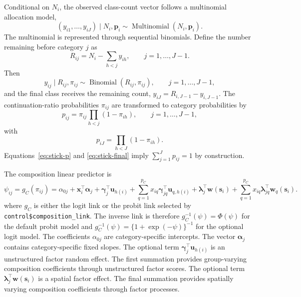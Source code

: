 \documentclass[11pt]{article}
\newcommand{\balpha}{\bm{\alpha}}
\newcommand{\bgamma}{\bm{\gamma}}
\newcommand{\blambda}{\bm{\lambda}}
\newcommand{\bp}{\bm{p}}
\newcommand{\bu}{\bm{u}}
\newcommand{\bw}{\bm{w}}
\newcommand{\bx}{\bm{x}}
\newcommand{\bs}{\bm{s}}
\newcommand{\trans}{^\top}
\newcommand{\Mult}{\operatorname{Multinomial}}
\newcommand{\Bin}{\operatorname{Binomial}}
\begin{document}
Conditional on \(N_i\), the observed class-count vector follows a multinomial
allocation model,
\begin{equation}
  (y_{i1},\ldots,y_{iJ})\mid N_i,\bp_i
  \sim
  \Mult(N_i,\bp_i).
  \label{eq:composition-multinomial}
\end{equation}
The multinomial is represented through sequential binomials. Define the number
remaining before category \(j\) as
\begin{equation}
  R_{ij}=N_i-\sum_{h<j}y_{ih},
  \qquad
  j=1,\ldots,J-1.
  \label{eq:remaining-count}
\end{equation}
Then
\begin{equation}
  y_{ij}\mid R_{ij},\pi_{ij}
  \sim
  \Bin(R_{ij},\pi_{ij}),
  \qquad
  j=1,\ldots,J-1,
  \label{eq:sequential-binomial}
\end{equation}
and the final class receives the remaining count, \(y_{iJ}=R_{i,J-1}-y_{i,J-1}\). The continuation-ratio
probabilities \(\pi_{ij}\) are transformed to category probabilities by
\begin{equation}
  p_{ij} =
  \pi_{ij}\prod_{h<j}(1-\pi_{ih}),
  \qquad
  j=1,\ldots,J-1,
  \label{eq:stick-p}
\end{equation}
with
\begin{equation}
  p_{iJ} =
  \prod_{h<J}(1-\pi_{ih}).
  \label{eq:stick-final}
\end{equation}
Equations~\ref{eq:stick-p} and \ref{eq:stick-final} imply
\(\sum_{j=1}^{J}p_{ij}=1\) by construction.

The composition linear predictor is
\begin{equation}
  \psi_{ij}
  =
  g_C(\pi_{ij})
  =
  \alpha_{0j}
  + \bx_i\trans\balpha_j
  + \bgamma_j\trans\bu_{h(i)}
  + \sum_{q=1}^{p_C}
      x_{iq}\bgamma_{jq}\trans
      \bu_{q,h(i)}
  + \blambda_j\trans\bw(\bs_i)
  + \sum_{q=1}^{p_C}
      x_{iq}\blambda_{jq}\trans
      \bw_{q}(\bs_i).
  \label{eq:composition-linear}
\end{equation}
where \(g_C\) is either the logit link or the probit link selected by
\texttt{control\$composition\_link}. The inverse link is therefore
\(g_C^{-1}(\psi)=\Phi(\psi)\) for the default probit model and
\(g_C^{-1}(\psi)=\{1+\exp(-\psi)\}^{-1}\) for the optional logit model.
The coefficients \(\alpha_{0j}\) are category-specific intercepts.
The vector \(\balpha_j\) contains category-specific fixed slopes. The optional
term \(\bgamma_j\trans\bu_{h(i)}\) is an unstructured factor random effect.
The first summation provides group-varying composition coefficients through
unstructured factor scores.
The optional term \(\blambda_j\trans\bw(\bs_i)\) is a spatial factor
effect. The final summation provides spatially varying composition
coefficients through factor processes.
\end{document}
